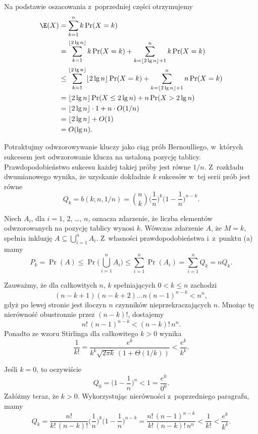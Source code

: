 \subproblem %
Na podstawie oszacowania z~poprzedniej części otrzymujemy
\begin{align*}
	\E(X) &= \sum_{k=1}^nk\Pr(X=k) \\
	&= \sum_{k=1}^{\lfloor2\lg n\rfloor}k\Pr(X=k)+\sum_{k=\lfloor2\lg n\rfloor+1}^nk\Pr(X=k) \\
	&\le \sum_{k=1}^{\lfloor2\lg n\rfloor}\lfloor2\lg n\rfloor\Pr(X=k)+\sum_{k=\lfloor2\lg n\rfloor+1}^nn\Pr(X=k) \\
	&= \lfloor2\lg n\rfloor\Pr(X\le2\lg n)+n\Pr(X>2\lg n) \\
	&= \lfloor2\lg n\rfloor\cdot1+n\cdot O(1/n) \\
	&= \lfloor2\lg n\rfloor+O(1) \\
	&= O(\lg n).
\end{align*}


\subproblem %
Potraktujmy odwzorowywanie kluczy jako ciąg prób Bernoulliego, w~których sukcesem jest odwzorowanie klucza na ustaloną pozycję tablicy.
Prawdopodobieństwo sukcesu każdej takiej próby jest równe $1/n$.
Z~rozkładu dwumianowego wynika, że uzyskanie dokładnie $k$ sukcesów w~tej serii prób jest równe
\[
	Q_k = b(k;n,1/n) = \binom{n}{k}\biggl(\frac{1}{n}\biggr)^k\biggl(1-\frac{1}{n}\biggr)^{n-k}.
\]

\subproblem %
Niech $A_i$, dla $i=1$, 2, \dots, $n$, oznacza zdarzenie, że liczba elementów odwzorowanych na  pozycję tablicy wynosi $k$.
Wówczas zdarzenie $A$, że $M=k$, spełnia inkluzję $A\subseteq\bigcup_{i=1}^nA_i$.
Z~własności prawdopodobieństwa i~z~punktu (a) mamy
\[
	P_k = \Pr(A) \le \Pr\biggl(\bigcup_{i=1}^nA_i\biggr) \le \sum_{i=1}^n\Pr(A_i) = \sum_{i=1}^nQ_k = nQ_k.
\]

\subproblem %
Zauważmy, że dla całkowitych $n$, $k$ spełniających $0<k\le n$ zachodzi
\[
	(n-k+1)(n-k+2)\dots n(n-1)^{n-k} < n^n,
\]
gdyż po lewej stronie jest iloczyn $n$ czynników nieprzekraczających $n$.
Mnożąc tę nierówność obustronnie przez $(n-k)!$, dostajemy
\[
	n!\,(n-1)^{n-k} < (n-k)!\,n^n.
\]
Ponadto ze wzoru Stirlinga dla całkowitego $k>0$ wynika
\[
	\frac{1}{k!} = \frac{e^k}{k^k\sqrt{2\pi k}\,(1+\Theta(1/k))} < \frac{e^k}{k^k}.
\]

Jeśli $k=0$, to oczywiście
\[
	Q_0 = \biggl(1-\frac{1}{n}\biggr)^n < 1 = \frac{e^0}{0^0}.
\]
Załóżmy teraz, że $k>0$.
Wykorzystując nierówności z~poprzedniego paragrafu, mamy
\[
	Q_k = \frac{n!}{k!\,(n-k)!}\biggl(\frac{1}{n}\biggr)^k\biggl(1-\frac{1}{n}\biggr)^{n-k} = \frac{n!\,(n-1)^{n-k}}{k!\,(n-k)!\,n^n} < \frac{1}{k!} < \frac{e^k}{k^k}.
\]

